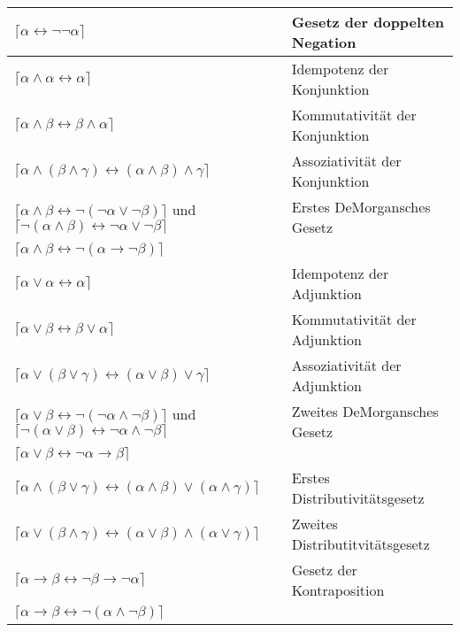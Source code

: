 \documentclass{scrartcl}
\begin{document}
\begin{tabularx}{\linewidth}{l|l}
	$ \lceil \alpha \leftrightarrow \neg \neg \alpha \rceil $ & Gesetz der doppelten Negation \\
	\hline
	$ \lceil \alpha \wedge \alpha \leftrightarrow \alpha \rceil $ & Idempotenz der Konjunktion \\
	\hline
	$ \lceil \alpha \wedge \beta \leftrightarrow \beta \wedge \alpha \rceil $ & Kommutativität der Konjunktion \\
	\hline
	$ \lceil \alpha \wedge (\beta \wedge \gamma) \leftrightarrow (\alpha \wedge \beta) \wedge \gamma \rceil $ & Assoziativität der Konjunktion \\
	\hline
	$ \lceil \alpha \wedge \beta \leftrightarrow \neg (\neg \alpha \vee \neg \beta) \rceil $ und $ \lceil \neg (\alpha \wedge \beta) \leftrightarrow \neg \alpha \vee \neg  \beta \rceil $ & Erstes DeMorgansches Gesetz \\
	\hline
	$ \lceil \alpha \wedge \beta \leftrightarrow \neg (\alpha \rightarrow \neg \beta) \rceil $ &  \\
	\hline
	$ \lceil \alpha \vee \alpha \leftrightarrow \alpha \rceil $ & Idempotenz der Adjunktion \\
	\hline
	$ \lceil \alpha \vee \beta \leftrightarrow \beta \vee \alpha \rceil $ & Kommutativität der Adjunktion \\
	\hline
	$ \lceil \alpha \vee (\beta \vee \gamma) \leftrightarrow (\alpha \vee \beta) \vee \gamma \rceil $ & Assoziativität der Adjunktion \\
	\hline
	$ \lceil \alpha \vee \beta \leftrightarrow \neg (\neg \alpha \wedge \neg \beta) \rceil $ und $ \lceil \neg (\alpha \vee \beta) \leftrightarrow \neg \alpha \wedge \neg \beta \rceil $ & Zweites DeMorgansches Gesetz \\
	\hline
	$ \lceil \alpha \vee \beta \leftrightarrow \neg  \alpha \rightarrow \beta \rceil $ &  \\
	\hline
	$ \lceil \alpha \wedge (\beta \vee \gamma) \leftrightarrow (\alpha \wedge \beta) \vee (\alpha \wedge \gamma) \rceil $ & Erstes Distributivitätsgesetz \\
	\hline
	$ \lceil \alpha \vee (\beta \wedge \gamma) \leftrightarrow (\alpha \vee \beta) \wedge (\alpha \vee \gamma) \rceil $ & Zweites Distributitvitätsgesetz \\
	\hline
	$ \lceil \alpha \rightarrow \beta \leftrightarrow \neg \beta \rightarrow \neg \alpha \rceil $ & Gesetz der Kontraposition \\
	\hline
	$ \lceil \alpha \rightarrow \beta \leftrightarrow \neg (\alpha \wedge \neg \beta) \rceil $ &  \\

\end{tabularx}
\end{document}
